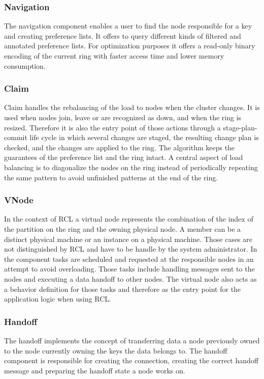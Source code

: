 \subsubsection{Navigation}
	The navigation component enables a user to find the node responsible for a key and creating preference lists.
	It offers to query different kinds of filtered and annotated preference lists.
	For optimization purposes it offers a read-only binary encoding of the current ring with faster access time and lower memory consumption.

\subsubsection{Claim}
	\label{sec:claim}
	Claim handles the rebalancing of the load to nodes when the cluster changes.
	It is used when nodes join, leave or are recognized as down, and when the ring is resized.
	Therefore it is also the entry point of those actions through a stage-plan-commit life cycle in which several changes are staged, the resulting change plan is checked, and the changes are applied to the ring.
	The algorithm keeps the guarantees of the preference list and the ring intact.
	A central aspect of load balancing is to diagonalize the nodes on the ring instead of periodically repeating the same pattern to avoid unfinished patterns at the end of the ring.

\subsubsection{VNode}
	In the context of \ac{RCL} a virtual node represents the combination of the index of the partition on the ring and the owning physical node.
	A member can be a distinct physical machine or an instance on a physical machine.
	Those cases are not distinguished by \ac{RCL} and have to be handle by the system administrator.
	In the component tasks are scheduled and requested at the responsible nodes in an attempt to avoid overloading.
	Those tasks include handling messages sent to the nodes and executing a data handoff to other nodes.
	The virtual node also acts as a behavior definition for those tasks and therefore as the entry point for the application logic when using \ac{RCL}.

\subsubsection{Handoff}
	The handoff implements the concept of transferring data a node previously owned to the node currently owning the keys the data belongs to.
	The handoff component is responsible for creating the connection, creating the correct handoff message and preparing the handoff state a node works on.

